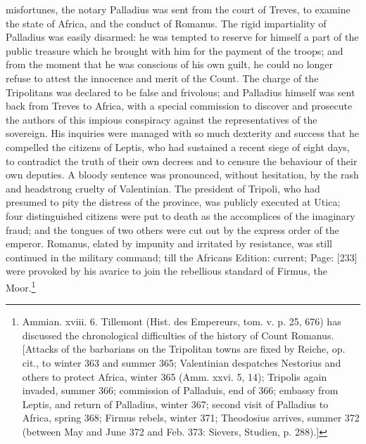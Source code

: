 misfortunes, the notary Palladius was sent from the court of Treves, to examine the state of Africa, and the conduct of Romanus. The rigid impartiality of Palladius was easily disarmed: he was tempted to reserve for himself a part of the public treasure which he brought with him for the payment of the troops; and from the moment that he was conscious of his own guilt, he could no longer refuse to attest the innocence and merit of the Count. The charge of the Tripolitans was declared to be false and frivolous; and Palladius himself was sent back from Treves to Africa, with a special commission to discover and prosecute the authors of this impious conspiracy against the representatives of the sovereign. His inquiries were managed with so much dexterity and success that he compelled the citizens of Leptis, who had sustained a recent siege of eight days, to contradict the truth of their own decrees and to censure the behaviour of their own deputies. A bloody sentence was pronounced, without hesitation, by the rash and headstrong cruelty of Valentinian. The president of Tripoli, who had presumed to pity the distress of the province, was publicly executed at Utica; four distinguished citizens were put to death as the accomplices of the imaginary fraud; and the tongues of two others were cut out by the express order of the emperor. Romanus, elated by impunity and irritated by resistance, was still continued in the military command; till the Africans Edition: current; Page: [233] were provoked by his avarice to join the rebellious standard of Firmus, the Moor.\footnote{Ammian. xviii. 6. Tillemont (Hist. des Empereurs, tom. v. p. 25, 676) has discussed the chronological difficulties of the history of Count Romanus. [Attacks of the barbarians on the Tripolitan towns are fixed by Reiche, op. cit., to winter 363 and summer 365; Valentinian despatches Nestorius and others to protect Africa, winter 365 (Amm. xxvi. 5, 14); Tripolis again invaded, summer 366; commission of Palladuis, end of 366; embassy from Leptis, and return of Palladius, winter 367; second visit of Palladius to Africa, spring 368; Firmus rebels, winter 371; Theodosius arrives, summer 372 (between May and June 372 and Feb. 373: Sievers, Studien, p. 288).]}

